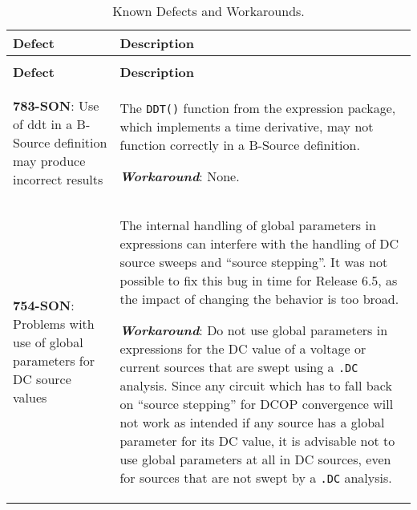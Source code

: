 




{
\small

\begin{longtable}[h] {>{\raggedright\small}m{2in}|>{\raggedright\let\\\tabularnewline\small}m{3.5in}}
  \caption{Known Defects and Workarounds.} \\ \hline
  \rowcolor{XyceDarkBlue} \color{white}\bf Defect & \color{white}\bf Description
  \\ \hline \endfirsthead
  \caption[]{Known Defects and Workarounds.} \\ \hline
  \rowcolor{XyceDarkBlue} \color{white}\bf Defect & \color{white}\bf Description
  \\ \hline \endhead

%
%  
\textbf{783-SON}: Use of ddt in a B-Source definition may produce incorrect results  & The \texttt{DDT()} 
function from the \Xyce{} expression package, which implements a time derivative, may not function 
correctly in a B-Source definition.

\textbf{\textit{Workaround}}: None. \\ \hline

\textbf{754-SON}: Problems with use of global parameters for DC source values & The internal handling of global parameters in expressions can interfere with the handling of DC source sweeps and ``source stepping''.  It was not possible to fix this bug in time for Release 6.5, as the impact of changing the behavior is too broad.

\textbf{\textit{Workaround}}: Do not use global parameters in expressions for the DC value of a voltage or current sources that are swept using a \texttt{.DC} analysis.  Since any circuit which has to fall back on ``source stepping'' for DCOP convergence will not work as intended if any source has a global parameter for its DC value, it is advisable not to use global parameters at all in DC sources, even for sources that are not swept by a \texttt{.DC} analysis. \\ \hline


\end{longtable}}
